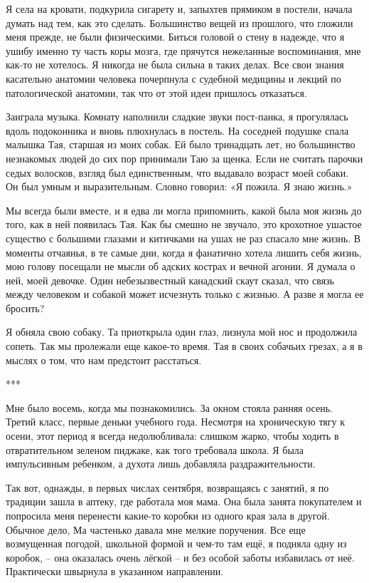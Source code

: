 \documentclass[
]{book}
\begin{document}
Я села на кровати, подкурила сигарету и, запыхтев прямиком в постели, начала думать над тем, как это сделать. Большинство вещей из прошлого, что гложили меня прежде, не были физическими. Биться головой о стену в надежде, что я ушибу именно ту часть коры мозга, где прячутся нежеланные воспоминания, мне как-то не хотелось. Я никогда не была сильна в таких делах. Все свои знания касательно анатомии человека почерпнула с судебной медицины и лекций по патологической анатомии, так что от этой идеи пришлось отказаться.

Заиграла музыка. Комнату наполнили сладкие звуки пост-панка, я прогулялась вдоль подоконника и вновь плюхнулась в постель. На соседней подушке спала малышка Тая, старшая из моих собак. Ей было тринадцать лет, но большинство незнакомых людей до сих пор принимали Таю за щенка. Если не считать парочки седых волосков, взгляд был единственным, что выдавало возраст моей собаки. Он был умным и выразительным. Словно говорил: «Я пожила. Я знаю жизнь.»

Мы всегда были вместе, и я едва ли могла припомнить, какой была моя жизнь до того, как в ней появилась Тая. Как бы смешно не звучало, это крохотное ушастое существо с большими глазами и китичками на ушах не раз спасало мне жизнь. В моменты отчаянья, в те самые дни, когда я фанатично хотела лишить себя жизнь, мою голову посещали не мысли об адских кострах и вечной агонии. Я думала о ней, моей девочке. Один небезызвестный канадский скаут сказал, что связь между человеком и собакой может исчезнуть только с жизнью. А разве я могла ее бросить?

Я обняла свою собаку. Та приоткрыла один глаз, лизнула мой нос и продолжила сопеть. Так мы пролежали еще какое-то время. Тая в своих собачьих грезах, а я в мыслях о том, что нам предстоит расстаться.

***

Мне было восемь, когда мы познакомились. За окном стояла ранняя осень. Третий класс, первые деньки учебного года. Несмотря на хроническую тягу к осени, этот период я всегда недолюбливала: слишком жарко, чтобы ходить в отвратительном зеленом пиджаке, как того требовала школа. Я была импульсивным ребенком, а духота лишь добавляла раздражительности.

Так вот, однажды, в первых числах сентября, возвращаясь с занятий, я по традиции зашла в аптеку, где работала моя мама. Она была занята покупателем и попросила меня перенести какие-то коробки из одного края зала в другой. Обычное дело, Ма частенько давала мне мелкие поручения. Все еще возмущенная погодой, школьной формой и чем-то там ещё, я подняла одну из коробок, -- она оказалась очень лёгкой -- и без особой заботы избавилась от неё. Практически швырнула в указанном направлении.
\end{document}
